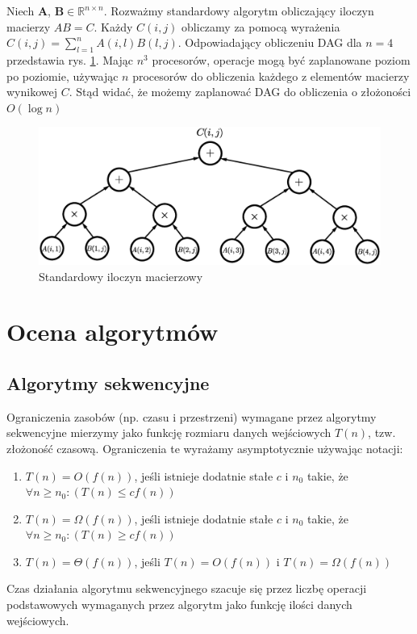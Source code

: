 \begin{przyklad}
Niech \(\mathbf{A}\), \(\mathbf{B}\in\mathbb{R}^{n\times n}\). Rozważmy standardowy algorytm obliczający iloczyn macierzy \(AB = C\). Każdy \(C(i, j)\) obliczamy za pomocą wyrażenia \(C(i, j)=\sum_{l=1}^{n}A(i,l)B(l,j)\). Odpowiadający obliczeniu DAG dla \(n=4\) przedstawia rys. \ref{fig:standard_parallel}. Mając \(n^3\) procesorów, operacje mogą być zaplanowane poziom po poziomie, używając \(n\) procesorów do obliczenia każdego z elementów macierzy wynikowej \(C\). Stąd widać, że możemy zaplanować DAG do obliczenia o złożoności \(O(\log{n})\)
\begin{figure}[H]
\centering
\includegraphics[width=34em]{images/Rys3.eps}
\caption{Standardowy iloczyn macierzowy}
\label{fig:standard_parallel}
\end{figure}

\end{przyklad}

\section{Ocena algorytmów}
\label{subsec:algorytmy_sekwencyjne}
\subsection{Algorytmy sekwencyjne}

Ograniczenia zasobów (np. czasu i przestrzeni) wymagane przez algorytmy sekwencyjne mierzymy jako funkcję rozmiaru danych wejściowych \(T(n)\), tzw. złożoność czasową. Ograniczenia te wyrażamy asymptotycznie używając notacji:

\begin{enumerate}
\item{\(T(n) = O(f(n))\), jeśli istnieje dodatnie stałe \(c\) i \(n_0\) takie, że \(\forall{n \geq n_0}: (T(n)\leq cf(n)) \)}
\item{\(T(n) = \Omega(f(n))\), jeśli istnieje dodatnie stałe \(c\) i \(n_0\) takie, że \(\forall{n \geq n_0}: (T(n)\geq cf(n)) \)}
\item{\(T(n) = \Theta(f(n))\), jeśli \(T(n)=O(f(n))\) i \(T(n)=\Omega(f(n))\)}
\end{enumerate}
Czas działania algorytmu sekwencyjnego szacuje się przez liczbę operacji podstawowych wymaganych przez algorytm jako funkcję ilości danych wejściowych.
